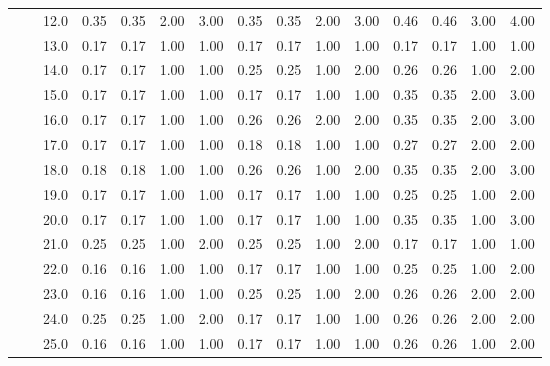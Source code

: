 \begin{tabular}{lllrrrrrrrrrrrr}
       &     & 12.0 &       0.35 &      0.35 & 2.00 &   3.00 &       0.35 &      0.35 & 2.00 &   3.00 &       0.46 &      0.46 & 3.00 &   4.00 \\
       &     & 13.0 &       0.17 &      0.17 & 1.00 &   1.00 &       0.17 &      0.17 & 1.00 &   1.00 &       0.17 &      0.17 & 1.00 &   1.00 \\
       &     & 14.0 &       0.17 &      0.17 & 1.00 &   1.00 &       0.25 &      0.25 & 1.00 &   2.00 &       0.26 &      0.26 & 1.00 &   2.00 \\
       &     & 15.0 &       0.17 &      0.17 & 1.00 &   1.00 &       0.17 &      0.17 & 1.00 &   1.00 &       0.35 &      0.35 & 2.00 &   3.00 \\
       &     & 16.0 &       0.17 &      0.17 & 1.00 &   1.00 &       0.26 &      0.26 & 2.00 &   2.00 &       0.35 &      0.35 & 2.00 &   3.00 \\
       &     & 17.0 &       0.17 &      0.17 & 1.00 &   1.00 &       0.18 &      0.18 & 1.00 &   1.00 &       0.27 &      0.27 & 2.00 &   2.00 \\
       &     & 18.0 &       0.18 &      0.18 & 1.00 &   1.00 &       0.26 &      0.26 & 1.00 &   2.00 &       0.35 &      0.35 & 2.00 &   3.00 \\
       &     & 19.0 &       0.17 &      0.17 & 1.00 &   1.00 &       0.17 &      0.17 & 1.00 &   1.00 &       0.25 &      0.25 & 1.00 &   2.00 \\
       &     & 20.0 &       0.17 &      0.17 & 1.00 &   1.00 &       0.17 &      0.17 & 1.00 &   1.00 &       0.35 &      0.35 & 1.00 &   3.00 \\
       &     & 21.0 &       0.25 &      0.25 & 1.00 &   2.00 &       0.25 &      0.25 & 1.00 &   2.00 &       0.17 &      0.17 & 1.00 &   1.00 \\
       &     & 22.0 &       0.16 &      0.16 & 1.00 &   1.00 &       0.17 &      0.17 & 1.00 &   1.00 &       0.25 &      0.25 & 1.00 &   2.00 \\
       &     & 23.0 &       0.16 &      0.16 & 1.00 &   1.00 &       0.25 &      0.25 & 1.00 &   2.00 &       0.26 &      0.26 & 2.00 &   2.00 \\
       &     & 24.0 &       0.25 &      0.25 & 1.00 &   2.00 &       0.17 &      0.17 & 1.00 &   1.00 &       0.26 &      0.26 & 2.00 &   2.00 \\
       &     & 25.0 &       0.16 &      0.16 & 1.00 &   1.00 &       0.17 &      0.17 & 1.00 &   1.00 &       0.26 &      0.26 & 1.00 &   2.00 \\

\end{tabular}
